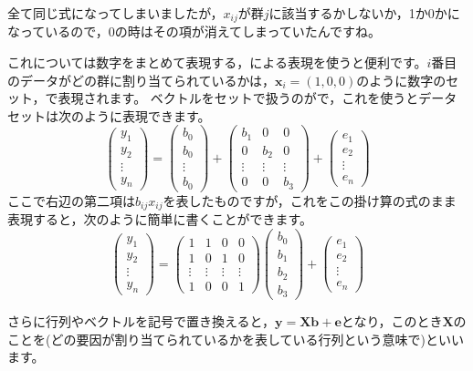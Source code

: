 \documentclass{ltjbook}
\begin{document}
全て同じ式になってしまいましたが，$x_{ij}$が群$j$に該当するかしないか，1か0かになっているので，0の時はその項が消えてしまっていたんですね。
\begin{tcolorbox}[title=デザイン行列,fonttitle=\gtfamily\sffamily\bfseries,colframe=blue,colback=blue!3!]

これについては数字をまとめて表現する，による表現を使うと便利です。$i$番目のデータがどの群に割り当てられているかは，$\bm{x}_i = (1,0,0) $のように数字のセット，で表現されます。
ベクトルをセットで扱うのがで，これを使うとデータセットは次のように表現できます。
\[
  \begin{pmatrix} y_1 \\ y_2 \\ \vdots \\ y_n \end{pmatrix}
   = 
   \begin{pmatrix} b_0 \\ b_0 \\ \vdots \\ b_0 \end{pmatrix}
   +
   \begin{pmatrix} b_1 & 0 & 0 \\ 0 & b_2 & 0 \\ \vdots &\vdots & \vdots\\ 0 & 0 & b_3 \end{pmatrix}
  + 
  \begin{pmatrix} e_1 \\ e_2 \\ \vdots \\ e_n \end{pmatrix}
\]
ここで右辺の第二項は$b_{ij}x_{ij}$を表したものですが，これをこの掛け算の式のまま表現すると，次のように簡単に書くことができます。
\[
  \begin{pmatrix} y_1 \\ y_2 \\ \vdots \\ y_n \end{pmatrix}
   = 
   \begin{pmatrix} 1 & 1 & 0 & 0 \\ 1 & 0 & 1 & 0 \\ \vdots  & \vdots & \vdots & \vdots \\ 1 & 0 & 0 & 1 \end{pmatrix}
   \begin{pmatrix} b_0 \\ b_1 \\ b_2 \\ b_3 \end{pmatrix}
   + 
   \begin{pmatrix} e_1 \\ e_2 \\ \vdots \\ e_n \end{pmatrix} 
\]

さらに行列やベクトルを記号で置き換えると，$\bm{y} = \bm{Xb} + \bm{e}$となり，このとき$\bm{X}$のことを(どの要因が割り当てられているかを表している行列という意味で)といいます。
\end{tcolorbox}
\end{document}
